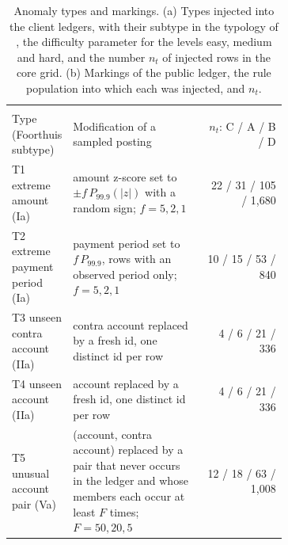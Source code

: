 \begin{table}[tbp]
\caption{Anomaly types and markings. (a) Types injected into the client ledgers, with their subtype in the typology of \citet{foorthuis2021nature}, the difficulty parameter for the levels easy, medium and hard, and the number $n_t$ of injected rows in the core grid. (b) Markings of the public ledger, the rule population into which each was injected, and $n_t$.}
\label{tab:types}
\centering
\footnotesize
\setlength{\tabcolsep}{4pt}
\begin{tabular}{@{}>{\raggedright\arraybackslash}p{0.22\linewidth}>{\raggedright\arraybackslash}p{0.47\linewidth}r@{}}
\toprule
\multicolumn{3}{@{}l}{\textit{(a) Types injected into the client ledgers}} \\
Type (Foorthuis subtype) & Modification of a sampled posting & $n_t$: C / A / B / D \\
\midrule
T1 extreme amount (Ia) & amount z-score set to $\pm f\,P_{99.9}(|z|)$ with a random sign; $f = 5, 2, 1$ & 22 / 31 / 105 / 1,680 \\
T2 extreme payment period (Ia) & payment period set to $f\,P_{99.9}$, rows with an observed period only; $f = 5, 2, 1$ & 10 / 15 / 53 / 840 \\
T3 unseen contra account (IIa) & contra account replaced by a fresh id, one distinct id per row & 4 / 6 / 21 / 336 \\
T4 unseen account (IIa) & account replaced by a fresh id, one distinct id per row & 4 / 6 / 21 / 336 \\
T5 unusual account pair (Va) & (account, contra account) replaced by a pair that never occurs in the ledger and whose members each occur at least $F$ times; $F = 50, 20, 5$ & 12 / 18 / 63 / 1,008 \\
\bottomrule
\end{tabular}


\end{table}
